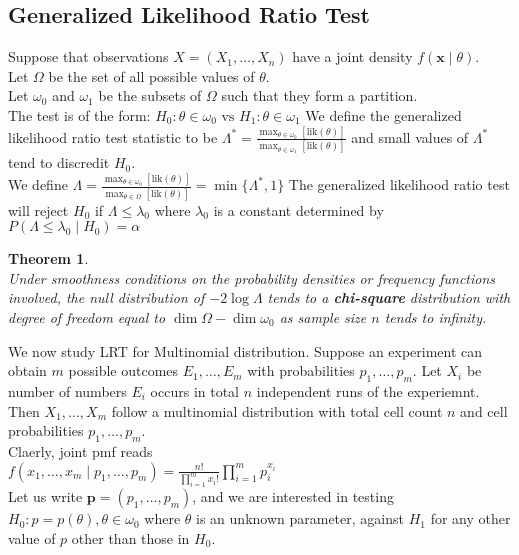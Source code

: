 \documentclass[12pt]{article}
\newtheorem{theorem}{Theorem}[section]
\theoremstyle{definition}
\begin{document}
\subsection{Generalized Likelihood Ratio Test}
Suppose that observations $X=(X_1,\ldots, X_n)$ have a joint density $f(\bm{x}\mid \theta)$.\\
Let $\Omega$ be the set of all possible values of $\theta$.\\
Let $\omega_0$ and $\omega_1$ be the subsets of $\Omega$ such that they form a partition.\\
The test is of the form:
$
H_0:\theta\in\omega_0\text{ vs }H_1:\theta\in\omega_1
$
We define the generalized likelihood ratio test statistic to be
$
\Lambda^\ast = \frac{\max_{\theta\in \omega_0}[\text{lik}(\theta)]}{\max_{\theta\in \omega_1}[\text{lik}(\theta)]}
$
and small values of $\Lambda^\ast$ tend to discredit $H_0$.\\
We define
$
\Lambda= \frac{\max_{\theta\in \omega_0}[\text{lik}(\theta)]}{\max_{\theta\in \Omega}[\text{lik}(\theta)]}=\min\{\Lambda^\ast, 1\}
$
The generalized likelihood ratio test will reject $H_0$ if
$
\Lambda\leq \lambda_0
$
where $\lambda_0$ is a constant determined by
$
P(\Lambda\leq \lambda_0\mid H_0)=\alpha
$
\begin{theorem}
\hfill\\\normalfont Under smoothness conditions on the probability densities or frequency functions involved, the null distribution of $-2\log \Lambda$ tends to a \textbf{chi-square} distribution with degree of freedom equal to 
$
\dim \Omega - \dim \omega_0
$
as sample size $n$ tends to infinity.
\end{theorem}
We now study LRT for Multinomial distribution. Suppose an experiment can obtain $m$ possible outcomes $E_1,\ldots, E_m$ with probabilities $p_1, \ldots, p_m$. Let $X_i$ be number of numbers $E_i$ occurs in total $n$ independent runs of the experiemnt. Then $X_1,\ldots, X_m$ follow a multinomial distribution with total cell count $n$ and cell probabilities $p_1,\ldots, p_m$.\\
Claerly, joint pmf reads\\
$
f(x_1,\ldots, x_m\mid p_1,\ldots, p_m) = \frac{n!}{\prod_{i=1}^m x_i!}\prod_{i=1}^m p_i^{x_i}
$\\
Let us write $\bm{p}=(p_1,\ldots, p_m)$, and we are interested in testing 
$
H_0:p=p(\theta), \theta\in \omega_0
$
where $\theta$ is an unknown parameter, against $H_1$ for any other value of $p$ other than those in $H_0$.\\
\end{document}
